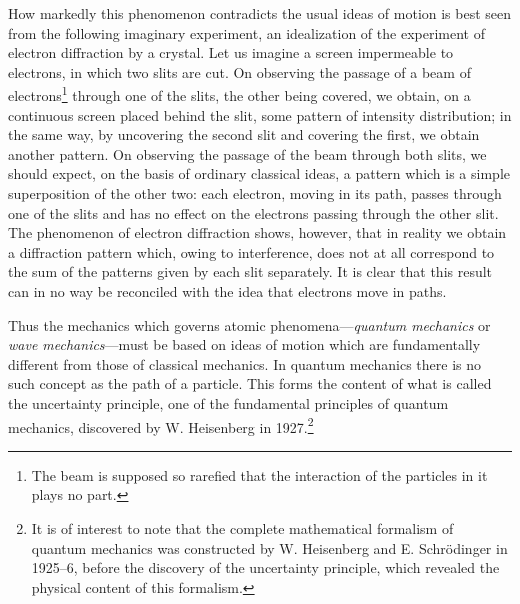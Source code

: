 How markedly this phenomenon contradicts the usual ideas of motion is best seen from the following imaginary experiment, an idealization of the experiment of electron diffraction by a crystal. Let us imagine a screen impermeable to electrons, in which two slits are cut. On observing the passage of a beam of electrons\footnote{The beam is supposed so rarefied that the interaction of the particles in it plays no part.
} through one of the slits, the other being covered, we obtain, on a continuous screen placed behind the slit, some pattern of intensity distribution; in the same way, by uncovering the second slit and covering the first, we obtain another pattern. On observing the passage of the beam through both slits, we should expect, on the basis of ordinary classical ideas, a pattern which is a simple superposition of the other two: each electron, moving in its path, passes through one of the slits and has no effect on the electrons passing through the other slit. The phenomenon of electron diffraction shows, however, that in reality we obtain a diffraction pattern which, owing to interference, does not at all correspond to the sum of the patterns given by each slit separately. It is clear that this result can in no way be reconciled with the idea that electrons move in paths.


Thus the mechanics which governs atomic phenomena—\textit{quantum mechanics} or \textit{wave mechanics}—must be based on ideas of motion which are fundamentally different from those of classical mechanics. In quantum mechanics there is no such concept as the path of a particle. This forms the content of what is called the uncertainty principle, one of the fundamental principles of quantum mechanics, discovered by W. Heisenberg in 1927.\footnote{It is of interest to note that the complete mathematical formalism of quantum mechanics was constructed by W. Heisenberg and E. Schrödinger in 1925–6, before the discovery of the uncertainty principle, which revealed the physical content of this formalism.
}


